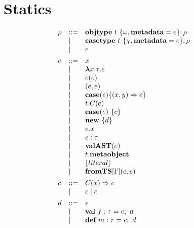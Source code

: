 \section{Statics}




\begin{figure}
\centering
\[
\begin{array}[t]{lll} 
\rho & \bnfdef & \keyw{objtype}~ t~ \{ \omega, \keyw{metadata}=e \}; \rho \\
     & \bnfalt & \keyw{casetype}~ t~ \{ \chi, \keyw{metadata}=e \}; \rho\\
     & \bnfalt & e
     \\[1ex]
e    & \bnfdef & x \\
     & \bnfalt & \boldsymbol\lambda x{:}\tau . e \\ %
     & \bnfalt & e(e) \\
     & \bnfalt & (e, e) \\
     & \bnfalt & \keyw{case}(e) \{(x, y) \Rightarrow e\}\\
     & \bnfalt & t.C(e) \\
     & \bnfalt & \keyw{case}(e)~\{ c \} \\
     & \bnfalt & \keyw{new}~ \{ d \}\\
     & \bnfalt & e.x \\
     & \bnfalt & e : \tau\\
     & \bnfalt & \keyw{valAST}(e) \\
     & \bnfalt & t.\keyw{metaobject}\\
     & \bnfalt & \lfloor literal \rfloor \\
     & \bnfalt & \keyw{fromTS}[\Gamma](e, e)
\\[1ex]	
c    & \bnfdef & C(x) \Rightarrow e\\
     & \bnfalt & c \bnfalt c
	 \\[1ex]
d   & \bnfdef & \varepsilon \\
     & \bnfalt & \keyw{val}~ f:\tau = e;~d \\
     & \bnfalt & \keyw{def}~ m:\tau = e;~d
\\[1ex] 
\end{array}
\begin{array}[t]{lll}
~~~
\end{array}
\begin{array}[t]{lll}



\end{array}\]
\end{figure}
